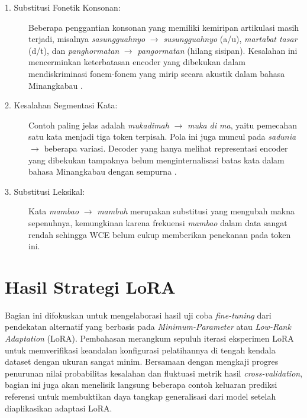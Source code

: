 \begin{description}
    \item[1. Substitusi Fonetik Konsonan:] Beberapa penggantian konsonan yang memiliki kemiripan artikulasi masih terjadi, misalnya \textit{sasungguahnyo} $\rightarrow$ \textit{susungguahnyo} (a/u), \textit{martabat tasar} (d/t), dan \textit{panghormatan} $\rightarrow$ \textit{pangormatan} (hilang sisipan). Kesalahan ini mencerminkan keterbatasan encoder yang dibekukan dalam mendiskriminasi fonem-fonem yang mirip secara akustik dalam bahasa Minangkabau \cite{koto2020minangkabau}.

    \item[2. Kesalahan Segmentasi Kata:] Contoh paling jelas adalah \textit{mukadimah} $\rightarrow$ \textit{muka di ma}, yaitu pemecahan satu kata menjadi tiga token terpisah. Pola ini juga muncul pada \textit{sadunia} $\rightarrow$ beberapa variasi. Decoder yang hanya melihat representasi encoder yang dibekukan tampaknya belum menginternalisasi batas kata dalam bahasa Minangkabau dengan sempurna \cite{sovia2022minangkabau}.

    \item[3. Substitusi Leksikal:] Kata \textit{mambao} $\rightarrow$ \textit{mambuh} merupakan substitusi yang mengubah makna sepenuhnya, kemungkinan karena frekuensi \textit{mambao} dalam data sangat rendah sehingga WCE belum cukup memberikan penekanan pada token ini.
\end{description}

\section{Hasil Strategi LoRA} \label{IV.LoRA}

Bagian ini difokuskan untuk mengelaborasi hasil uji coba \textit{fine-tuning} dari pendekatan alternatif yang berbasis pada \textit{Minimum-Parameter} atau \textit{Low-Rank Adaptation} (LoRA). Pembahasan merangkum sepuluh iterasi eksperimen LoRA untuk memverifikasi keandalan konfigurasi pelatihannya di tengah kendala dataset dengan ukuran sangat minim. Bersamaan dengan mengkaji progres penurunan nilai probabilitas kesalahan dan fluktuasi metrik hasil \textit{cross-validation}, bagian ini juga akan menelisik langsung beberapa contoh keluaran prediksi referensi untuk membuktikan daya tangkap generalisasi dari model setelah diaplikasikan adaptasi LoRA.

